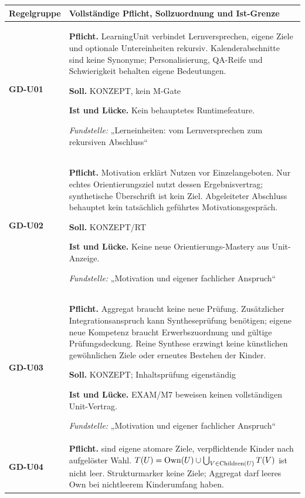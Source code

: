 \begingroup\small
\begin{longtable}{@{}P{20mm}P{128mm}@{}}
\toprule
Regelgruppe & Vollständige Pflicht, Sollzuordnung und Ist-Grenze\\
\midrule\endhead
{}\label{rule:GD-U01}\textbf{GD-U01} &
\textbf{Pflicht.} LearningUnit verbindet Lernversprechen, eigene Ziele und optionale Untereinheiten rekursiv. Kalenderabschnitte sind keine Synonyme; Personalisierung, QA-Reife und Schwierigkeit behalten eigene Bedeutungen.\par\smallskip
\textbf{Soll.} KONZEPT, kein M-Gate\par\smallskip
\textbf{Ist und Lücke.} Kein behauptetes Runtimefeature.\par\smallskip
\emph{Fundstelle:} „Lerneinheiten: vom Lernversprechen zum rekursiven Abschluss“\\\addlinespace[5pt]
\label{rule:GD-U02}\textbf{GD-U02} &
\textbf{Pflicht.} Motivation erklärt Nutzen vor Einzelangeboten. Nur echtes Orientierungsziel nutzt dessen Ergebnisvertrag; synthetische Überschrift ist kein Ziel. Abgeleiteter Abschluss behauptet kein tatsächlich geführtes Motivationsgespräch.\par\smallskip
\textbf{Soll.} KONZEPT/RT\par\smallskip
\textbf{Ist und Lücke.} Keine neue Orientierungs-Mastery aus Unit-Anzeige.\par\smallskip
\emph{Fundstelle:} „Motivation und eigener fachlicher Anspruch“\\\addlinespace[5pt]
\label{rule:GD-U03}\textbf{GD-U03} &
\textbf{Pflicht.} Aggregat braucht keine neue Prüfung. Zusätzlicher Integrationsanspruch kann Syntheseprüfung benötigen; eigene neue Kompetenz braucht Erwerbszuordnung und gültige Prüfungsdeckung. Reine Synthese erzwingt keine künstlichen gewöhnlichen Ziele oder erneutes Bestehen der Kinder.\par\smallskip
\textbf{Soll.} KONZEPT; Inhaltsprüfung eigenständig\par\smallskip
\textbf{Ist und Lücke.} EXAM/M7 beweisen keinen vollständigen Unit-Vertrag.\par\smallskip
\emph{Fundstelle:} „Motivation und eigener fachlicher Anspruch“\\\addlinespace[5pt]
\label{rule:GD-U04}\textbf{GD-U04} &
\textbf{Pflicht.}  sind eigene atomare Ziele,  verpflichtende Kinder nach aufgelöster Wahl. \(T(U)=\operatorname{Own}(U)\cup\bigcup_{V\in\operatorname{Children}(U)}T(V)\) ist nicht leer. Strukturmarker keine Ziele; Aggregat darf leeres Own bei nichtleerem Kinderumfang haben.\par\smallskip

\end{longtable}
